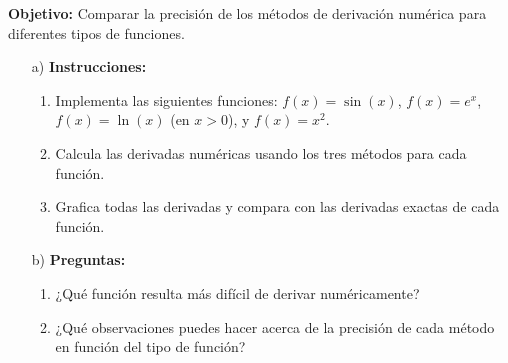 \documentclass{article}
\begin{document}
\textbf{Objetivo:} Comparar la precisión de los métodos de derivación numérica para diferentes tipos de funciones.

\begin{enumerate}
    \item[a)] \textbf{Instrucciones:}
    \begin{enumerate}
        \item Implementa las siguientes funciones: \(f(x) = \sin(x)\), \(f(x) = e^x\), \(f(x) = \ln(x)\) (en \(x > 0\)), y \(f(x) = x^2\).
        \item Calcula las derivadas numéricas usando los tres métodos para cada función.
        \item Grafica todas las derivadas y compara con las derivadas exactas de cada función.
    \end{enumerate}
    
    \item[b)] \textbf{Preguntas:}
    \begin{enumerate}
        \item ¿Qué función resulta más difícil de derivar numéricamente?
        \item ¿Qué observaciones puedes hacer acerca de la precisión de cada método en función del tipo de función?
    \end{enumerate}
\end{enumerate}
\end{document}
